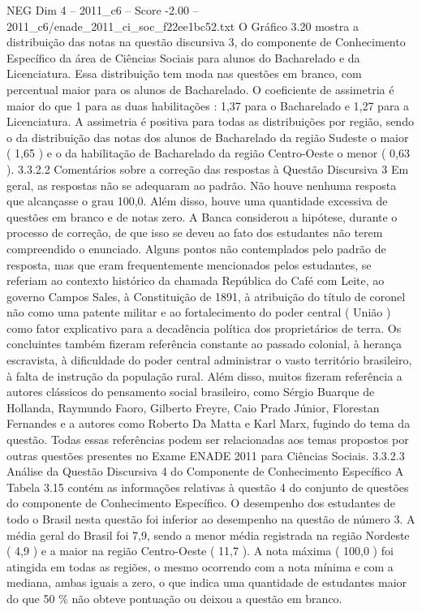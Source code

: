 \begin{textsample}{NEG Dim 4 – 2011\_c6 – Score -2.00 – 2011\_c6/enade\_2011\_ci\_soc\_f22ee1bc52.txt}
O Gráfico 3.20 mostra a distribuição das notas na questão discursiva 3, do componente de Conhecimento Específico da área de Ciências Sociais para alunos do Bacharelado e da Licenciatura.
Essa distribuição tem moda nas questões em branco, com percentual maior para os alunos de Bacharelado.
O coeficiente de assimetria é maior do que 1 para as duas habilitações : 1,37 para o Bacharelado e 1,27 para a Licenciatura.
A assimetria é positiva para todas as distribuições por região, sendo o da distribuição das notas dos alunos de Bacharelado da região Sudeste o maior ( 1,65 ) e o da habilitação de Bacharelado da região Centro-Oeste o menor ( 0,63 ). 3.3.2.2 Comentários sobre a correção das respostas à Questão Discursiva 3 Em geral, as respostas não se adequaram ao padrão.
Não houve nenhuma resposta que alcançasse o grau 100,0.
Além disso, houve uma quantidade excessiva de questões em branco e de notas zero.
A Banca considerou a hipótese, durante o processo de correção, de que isso se deveu ao fato dos estudantes não terem compreendido o enunciado.
Alguns pontos não contemplados pelo padrão de resposta, mas que eram frequentemente mencionados pelos estudantes, se referiam ao contexto histórico da chamada República do Café com Leite, ao governo Campos Sales, à Constituição de 1891, à atribuição do título de coronel não como uma patente militar e ao fortalecimento do poder central ( União ) como fator explicativo para a decadência política dos proprietários de terra.
Os concluintes também fizeram referência constante ao passado colonial, à herança escravista, à dificuldade do poder central administrar o vasto território brasileiro, à falta de instrução da população rural.
Além disso, muitos fizeram referência a autores clássicos do pensamento social brasileiro, como Sérgio Buarque de Hollanda, Raymundo Faoro, Gilberto Freyre, Caio Prado Júnior, Florestan Fernandes e a autores como Roberto Da Matta e Karl Marx, fugindo do tema da questão.
Todas essas referências podem ser relacionadas aos temas propostos por outras questões presentes no Exame ENADE 2011 para Ciências Sociais. 3.3.2.3 Análise da Questão Discursiva 4 do Componente de Conhecimento Específico A Tabela 3.15 contém as informações relativas à questão 4 do conjunto de questões do componente de Conhecimento Específico.
O desempenho dos estudantes de todo o Brasil nesta questão foi inferior ao desempenho na questão de número 3.
A média geral do Brasil foi 7,9, sendo a menor média registrada na região Nordeste ( 4,9 ) e a maior na região Centro-Oeste ( 11,7 ).
A nota máxima ( 100,0 ) foi atingida em todas as regiões, o mesmo ocorrendo com a nota mínima e com a mediana, ambas iguais a zero, o que indica uma quantidade de estudantes maior do que 50 \% não obteve pontuação ou deixou a questão em branco.

\end{textsample}
